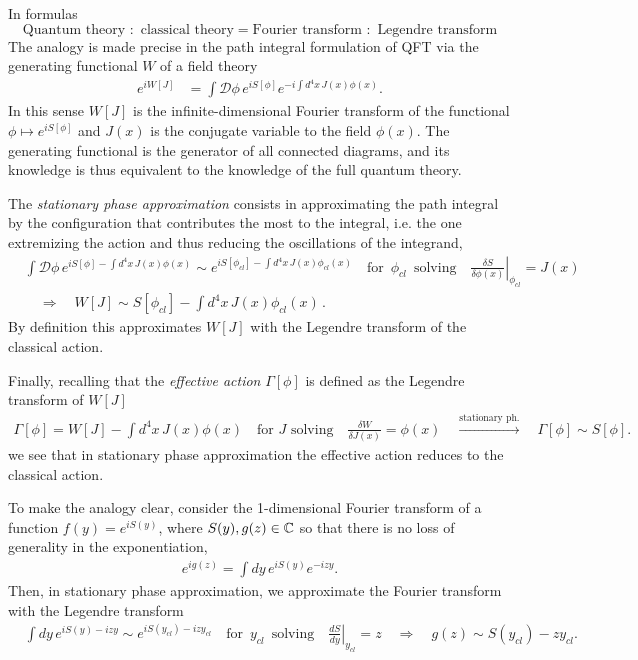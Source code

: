 \documentclass[../QFT_main.tex]{subfiles}
\begin{document}
\begin{mytheorem}
In formulas
    \begin{equation}
    \text{Quantum theory} \,\,:\,\, \text{classical theory} = \text{Fourier transform}\,\, :\,\, \text{Legendre transform}
\end{equation}
The analogy is made precise in the path integral formulation of QFT via the generating functional $W$ of a field theory
\begin{align}
    e^{iW[J]} &= \int \mathcal{D}\phi\, e^{iS[\phi]} e^{-i\int d^4x\, J(x)\phi(x)}.
\end{align}
In this sense $W[J]$ is the infinite-dimensional Fourier transform of the functional $\phi\mapsto e^{iS[\phi]}$ and $J(x)$ is the conjugate variable to the field $\phi(x)$.
The generating functional is the generator of all connected diagrams, and its knowledge is thus equivalent to the knowledge of the full quantum theory.

The \emph{stationary phase approximation} consists in approximating the path integral by the configuration that contributes the most to the integral, i.e. the one extremizing the action and thus reducing the oscillations of the integrand,
\begin{align}
    &\int \mathcal{D}\phi\, e^{iS[\phi]-\int d^4x\, J(x)\phi(x)} \sim e^{iS[\phi_{cl}]-\int d^4x\, J(x)\phi_{cl}(x)}\quad \text{for $\,\phi_{cl}\,$ solving}\quad \left.\frac{\delta S}{\delta \phi(x)}\right|_{\phi_{cl}} = J(x)\\
    &\quad \Rightarrow \quad W[J] \sim S[\phi_{cl}] - \int d^4x\, J(x)\phi_{cl}(x)\,.
\end{align} 
By definition this approximates $W[J]$ with the Legendre transform of the classical action.

Finally, recalling that the \emph{effective action} $\Gamma[\phi]$ is defined as the Legendre transform of $W[J]$
\begin{align}
    \Gamma[\phi] = W[J] - \int d^4x\, J(x)\phi(x) \quad \text{for $J$ solving}\quad \frac{\delta W}{\delta J(x)} = \phi(x) \quad \xrightarrow[]{\text{stationary ph.}}\quad \Gamma[\phi] \sim S[\phi].
\end{align}
we see that in stationary phase approximation the effective action reduces to the classical action.

To make the analogy clear, consider the 1-dimensional Fourier transform of a function $f(y) = e^{iS(y)}$, where $S(y), g(z)\in\mathbb{C}$ so that there is no loss of generality in the exponentiation,
\begin{align}
    e^{ig(z)}=\int dy\, e^{iS(y)} e^{-izy}.
\end{align}
Then, in stationary phase approximation, we approximate the Fourier transform with the Legendre transform
\begin{align}
    &\int dy\, e^{iS(y)-izy} \sim e^{iS(y_{cl}) - izy_{cl}}\quad \text{for $\,y_{cl}\,$ solving}\quad \left.\frac{dS}{dy}\right|_{y_{cl}} = z \quad \Rightarrow \quad g(z) \sim S(y_{cl}) - zy_{cl}.
\end{align}
%
\end{mytheorem}
\end{document}
